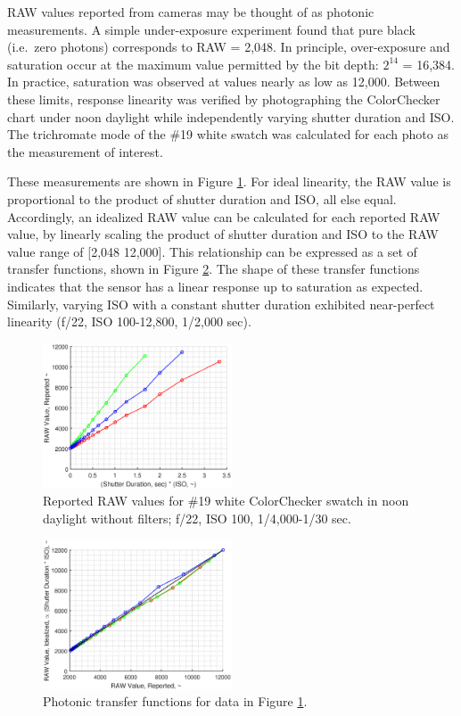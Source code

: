 \documentclass[twocolumn,10pt]{asme2ej}
\newcommand{\id}{\hspace{6 mm}}
\begin{document}
RAW values reported from cameras may be thought of as photonic measurements. A simple under-exposure experiment found that pure black (i.e.\ zero photons) corresponds to RAW = 2,048. In principle, over-exposure and saturation occur at the maximum value permitted by the bit depth: $2^{14}$ = 16,384. In practice, saturation was observed at values nearly as low as 12,000. Between these limits, response linearity was verified by photographing the ColorChecker chart under noon daylight while independently varying shutter duration and ISO. The trichromate mode of the \#19 white swatch was calculated for each photo as the measurement of interest.

\id These measurements are shown in Figure \ref{linearity_shutter_data}. For ideal linearity, the RAW value is proportional to the product of shutter duration and ISO, all else equal. Accordingly, an idealized RAW value can be calculated for each reported RAW value, by linearly scaling the product of shutter duration and ISO to the RAW value range of [2,048 12,000]. This relationship can be expressed as a set of transfer functions, shown in Figure \ref{linearity_shutter_curves}. The shape of these transfer functions indicates that the sensor has a linear response up to saturation as expected. Similarly, varying ISO with a constant shutter duration exhibited near-perfect linearity (f/22, ISO 100-12,800, 1/2,000 sec).

\begin{figure}
\centering
\includegraphics[width=0.5\textwidth]{linearity_shutter_data.eps}
\caption{Reported RAW values for \#19 white ColorChecker swatch in noon daylight without filters; f/22, ISO 100, 1/4,000-1/30 sec.}
\label{linearity_shutter_data}
\end{figure}

\begin{figure}
\centering
\includegraphics[width=0.5\textwidth]{linearity_shutter_curves.eps}
\caption{Photonic transfer functions for data in Figure \ref{linearity_shutter_data}.}
\label{linearity_shutter_curves}
\end{figure}
\end{document}
